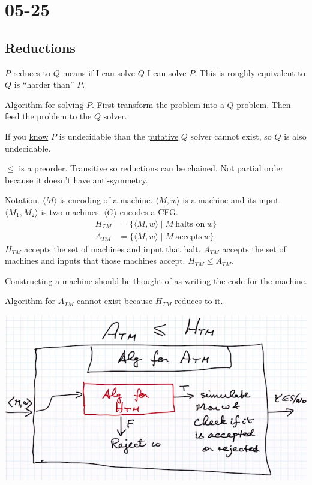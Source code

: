 \documentclass[../598comp.tex]{subfiles}
\date{05-25}
\begin{document}
\section{05-25}

\subsection{Reductions}

$P$ reduces to $Q$ means if I can solve $Q$ I can solve $P$. This is roughly
equivalent to $Q$ is ``harder than'' $P$.

Algorithm for solving $P$. First transform the problem into a $Q$ problem. Then
feed the problem to the $Q$ solver.

If you \ul{know} $P$ is undecidable than the \ul{putative} $Q$ solver cannot
exist, so $Q$ is also undecidable.

$\leq$ is a preorder. Transitive so reductions can be chained. Not partial order
because it doesn't have anti-symmetry.

Notation. $\langle M \rangle$ is encoding of a machine. $\langle M, w \rangle$
is a machine and its input. $\langle M_1, M_2 \rangle$ is two machines. $\langle
G \rangle$ encodes a CFG.
\begin{align*}
  H_{TM} &= \{\langle M, w \rangle \mid M \ \text{halts on} \ w\} \\
  A_{TM} &= \{\langle M, w \rangle \mid M \ \text{accepts} \ w\}
\end{align*}
$H_{TM}$ accepts the set of machines and input that halt. $A_{TM}$ accepts the
set of machines and inputs that those machines accept. $H_{TM} \leq A_{TM}$.

\begin{note}
  Constructing a machine should be thought of as writing the code for the machine.
\end{note}

Algorithm for $A_{TM}$ cannot exist because $H_{TM}$ reduces to it.

\includegraphics[width=\textwidth]{atm_to_htm_example}
\end{document}
